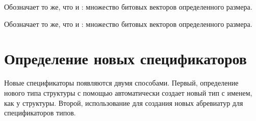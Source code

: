 \begin{flushdesc}

\item[\cd{(bit-vector \emph{размер})}]
Обозначает то же, что и : множество битовых
векторов определенного размера.

\item[\cd{(simple-bit-vector \emph{размер})}]
Обозначает то же, что и : множество битовых
векторов определенного размера.
\end{flushdesc}

\section{Определение новых спецификаторов}

Новые спецификаторы появляются двумя способами.
Первый, определение нового типа структуры с помощью  автоматически
создает новый тип с именем, как у структуры.
Второй, использование  для создания новых абревиатур для
спецификаторов типов.

